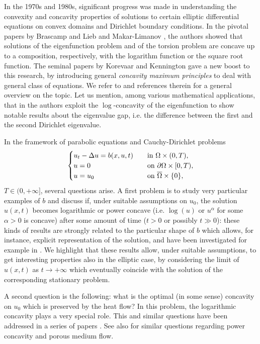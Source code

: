 \documentclass[11pt, reqno]{amsart}
\theoremstyle{definition}
\numberwithin{equation}{section}
\newcommand{\Omegabar}{\overline{\Omega}}
\begin{document}
In the 1970s and 1980s, significant progress was made in understanding the convexity and concavity properties of solutions to certain elliptic differential equations on convex domains and Dirichlet boundary conditions. In the pivotal papers by Brascamp and Lieb \cite{BrascampLieb} and Makar-Limanov \cite{MakarLimanov}, the authors showed that solutions of the eigenfunction problem and of the torsion problem are concave up to a composition, respectively, with the logarithm function or the square root function. The seminal papers by Korevaar \cite{Korevaar} and Kennington \cite{kennington} gave a new boost to this research, by introducing general \emph{concavity maximum principles} to deal with general class of equations. We refer to \cite{AAGS2023,GaSq24} and references therein for a general overview on the topic. 
Let us mention, among various mathematical applications, that in \cite{SWYY85} the authors exploit the $\log$-concavity of the eigenfunction to show notable results about the eigenvalue gap, i.e. the difference between the first and the second Dirichlet eigenvalue.

\smallskip

In the framework of parabolic equations and Cauchy-Dirichlet problems
$$
\begin{cases}
 u_t - \Delta u = b(x,u,t) & \quad \hbox{in $\Omega \times (0,T)$},\\
u=0 & \quad \hbox{on $\partial \Omega \times [0,T)$}, \\
u=u_0& \quad \hbox{on $\Omegabar \times \{0\}$},
\end{cases}
$$
$T \in (0, +\infty]$, several questions arise. 
A first problem is to study very particular examples of $b$ and discuss if, under suitable assumptions on $u_0$, the solution $u(x,t)$ becomes logarithmic or power concave (i.e. $\log(u)$ or $u^\alpha$ for some $\alpha>0$ is concave) after some amount of time ($t>0$ or possibly $t\gg 0$): these kinds of results are strongly related to the particular shape of $b$ which allows, for instance, explicit representation of the solution, and have been investigated for example in \cite{LeeVazquez, lee2008parabolic, Ish24}. 
We highlight that these results allow, under suitable assumptions, to get interesting properties also in the elliptic case, by considering the limit of $u(x,t)$ as $t\to +\infty$ which eventually coincide with the solution of the corresponding stationary problem.

A second question is the following: what is the optimal (in some sense) concavity on $u_0$ which is preserved by the heat flow? In this problem, the logarithmic concavity plays a very special role. 
This and similar questions have been addressed in a series of papers \cite{IshigeSalaniTakatsu2024, IshigeSalaniHeatFlow, IsSaTa22, IsSaTa20}. 
See also \cite{Daskalopoulos-Hamilton-Lee2001, ChauWeinkove} for similar questions regarding power concavity and porous medium flow. 
\end{document}
